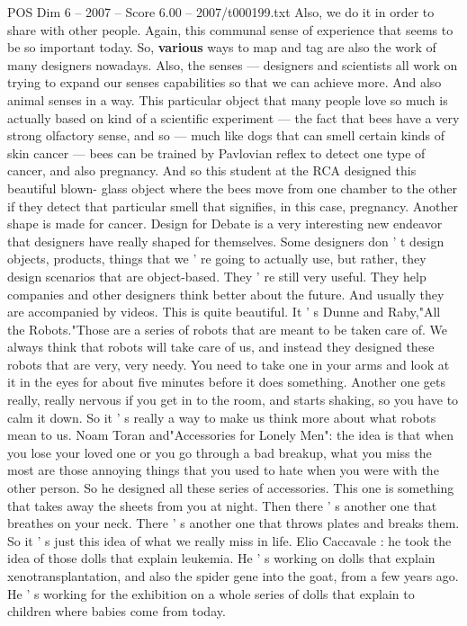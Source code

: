 \begin{textsample}{POS Dim 6 – 2007 – Score 6.00 – 2007/t000199.txt}
Also, we do it in order to share with other people.
Again, this communal sense of experience that seems to be so important today.
So, \textbf{various} ways to map and tag are also the work of many designers nowadays.
Also, the senses — designers and scientists all work on trying to expand our senses capabilities so that we can achieve more.
And also animal senses in a way.
This particular object that many people love so much is actually based on kind of a scientific experiment — the fact that bees have a very strong olfactory sense, and so — much like dogs that can smell certain kinds of skin cancer — bees can be trained by Pavlovian reflex to detect one type of cancer, and also pregnancy.
And so this student at the RCA designed this beautiful blown- glass object where the bees move from one chamber to the other if they detect that particular smell that signifies, in this case, pregnancy.
Another shape is made for cancer.
Design for Debate is a very interesting new endeavor that designers have really shaped for themselves.
Some designers don ' t design objects, products, things that we ' re going to actually use, but rather, they design scenarios that are object-based.
They ' re still very useful.
They help companies and other designers think better about the future.
And usually they are accompanied by videos.
This is quite beautiful.
It ' s Dunne and Raby,"All the Robots."Those are a series of robots that are meant to be taken care of.
We always think that robots will take care of us, and instead they designed these robots that are very, very needy.
You need to take one in your arms and look at it in the eyes for about five minutes before it does something.
Another one gets really, really nervous if you get in to the room, and starts shaking, so you have to calm it down.
So it ' s really a way to make us think more about what robots mean to us.
Noam Toran and"Accessories for Lonely Men": the idea is that when you lose your loved one or you go through a bad breakup, what you miss the most are those annoying things that you used to hate when you were with the other person.
So he designed all these series of accessories.
This one is something that takes away the sheets from you at night.
Then there ' s another one that breathes on your neck.
There ' s another one that throws plates and breaks them.
So it ' s just this idea of what we really miss in life.
Elio Caccavale : he took the idea of those dolls that explain leukemia.
He ' s working on dolls that explain xenotransplantation, and also the spider gene into the goat, from a few years ago.
He ' s working for the exhibition on a whole series of dolls that explain to children where babies come from today.

\end{textsample}
